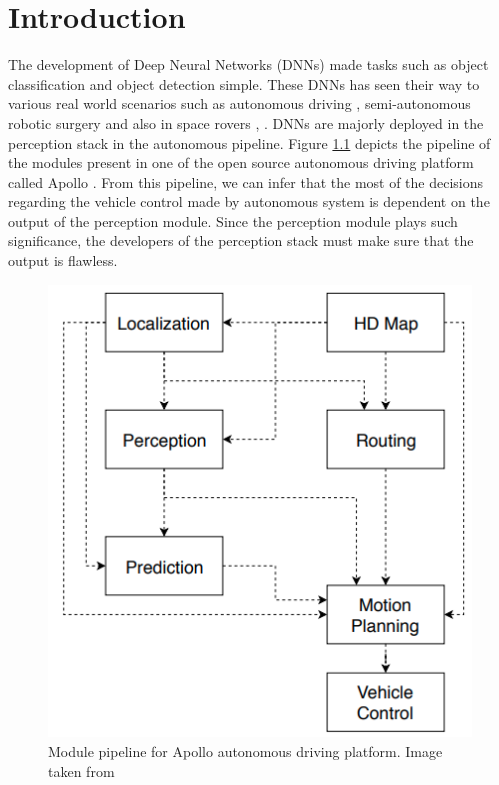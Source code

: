 

    \chapter{Introduction}

The development of Deep Neural Networks (DNNs) made tasks such as object classification and object detection simple.
These DNNs has seen their way to various real world scenarios such as autonomous driving \cite{autonomousdriving}, semi-autonomous robotic surgery \cite{roboticsurgery} and also in space rovers \cite{Marsrover_1}, \cite{Marsrover_2}.
DNNs are majorly deployed in the perception stack in the autonomous pipeline. 
Figure \ref{fig:Apollopipeline} depicts the pipeline of the modules present in one of the open source autonomous driving platform called Apollo \cite{baiduapollo}.
From this pipeline, we can infer that the most of the decisions regarding the vehicle control made by autonomous system is dependent on the output of the perception module.
Since the perception module plays such significance, the developers of the perception stack must make sure that the output is flawless.
\begin{figure}[h!]
    \centering
    \includegraphics[scale=0.35]{images/Apollopipeline.png}
    \caption{Module pipeline for Apollo autonomous driving platform. Image taken from \cite{baiduapollo}}
    \label{fig:Apollopipeline}
\end{figure}


